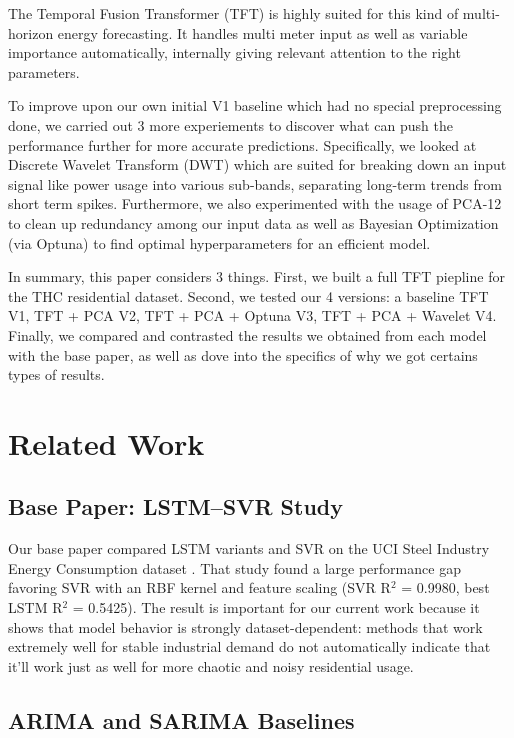 The Temporal Fusion Transformer (TFT) is highly suited for this kind of multi-horizon energy forecasting. It handles multi meter input as well as variable importance automatically, internally giving relevant attention to the right parameters. 

To improve upon our own initial V1 baseline which had no special preprocessing done, we carried out 3 more experiements to discover what can push the performance further for more accurate predictions. Specifically, we looked at Discrete Wavelet Transform (DWT) which are suited for breaking down an input signal like power usage into various sub-bands, separating long-term trends from short term spikes. Furthermore, we also experimented with the usage of PCA-12 to clean up redundancy among our input data as well as Bayesian Optimization (via Optuna) to find optimal hyperparameters for an efficient model. 

In summary, this paper considers 3 things. First, we built a full TFT piepline for the THC residential dataset. Second, we tested our 4 versions: a baseline TFT V1, TFT + PCA V2, TFT + PCA + Optuna V3, TFT + PCA + Wavelet V4. Finally, we compared and contrasted the results we obtained from each model with the base paper, as well as dove into the specifics of why we got certains types of results. 

\section{Related Work}
 
\subsection{Base Paper: LSTM--SVR Study}

Our base paper compared LSTM variants and SVR on the UCI Steel Industry Energy Consumption dataset \cite{reddy2022stacking}. That study found a large performance gap favoring SVR with an RBF kernel and feature scaling (SVR R$^2$ = 0.9980, best LSTM R$^2$ = 0.5425). The result is important for our current work because it shows that model
behavior is strongly dataset-dependent: methods that work extremely well for stable industrial demand do not automatically indicate that it'll work just as well for more chaotic and noisy residential usage.
 
\subsection{ARIMA and SARIMA Baselines}

